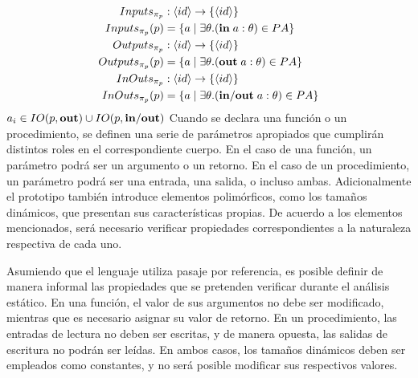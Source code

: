 

\iffalse
\begin{align*}
Inputs_{\pi_{p}} &: \langle id \rangle \rightarrow \{ \langle id \rangle \}
\\
Inputs_{\pi_{p}}(p) &= \{ a \mid \exists \theta. (\mathbf{in} \; a: \theta) \in PA \}
\\
Outputs_{\pi_{p}} &: \langle id \rangle \rightarrow \{ \langle id \rangle \}
\\
Outputs_{\pi_{p}}(p) &= \{ a \mid \exists \theta. (\mathbf{out} \; a: \theta) \in PA \}
\\
InOuts_{\pi_{p}} &: \langle id \rangle \rightarrow \{ \langle id \rangle \}
\\
InOuts_{\pi_{p}}(p) &= \{ a \mid \exists \theta. (\mathbf{in/out} \; a: \theta) \in PA \}
\end{align*}
$a_i \in IO(p, \mathbf{out}) \cup IO(p, \mathbf{in/out})$
Cuando se declara una función o un procedimiento, se definen una serie de parámetros apropiados que cumplirán distintos roles en el correspondiente cuerpo.
En el caso de una función, un parámetro podrá ser un argumento o un retorno.
En el caso de un procedimiento, un parámetro podrá ser una entrada, una salida, o incluso ambas.
Adicionalmente el prototipo también introduce elementos polimórficos, como los tamaños dinámicos, que presentan sus características propias.
De acuerdo a los elementos mencionados, será necesario verificar propiedades correspondientes a la naturaleza respectiva de cada uno.

Asumiendo que el lenguaje utiliza pasaje por referencia, es posible definir de manera informal las propiedades que se pretenden verificar durante el análisis estático.
En una función, el valor de sus argumentos no debe ser modificado, mientras que es necesario asignar su valor de retorno.
En un procedimiento, las entradas de lectura no deben ser escritas, y de manera opuesta, las salidas de escritura no podrán ser leídas.
En ambos casos, los tamaños dinámicos deben ser empleados como constantes, y no será posible modificar sus respectivos valores.
